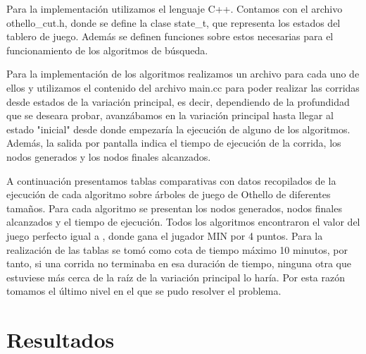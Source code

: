 \documentclass{article}
\begin{document}
\hspace{0.5cm}Para la implementación utilizamos el lenguaje C++. Contamos con el archivo
othello\_cut.h, donde se define la clase state\_t, que representa los estados del tablero de juego. Además
se definen funciones sobre estos necesarias para el funcionamiento de los algoritmos de búsqueda. 

Para la implementación de los algoritmos realizamos un archivo para cada uno de ellos y utilizamos el contenido del archivo main.cc para poder realizar las corridas desde estados de la variación principal, es decir, dependiendo de la profundidad que se deseara probar, avanzábamos en la variación principal hasta llegar al estado "inicial" desde donde empezaría la ejecución de alguno de los algoritmos. Además, la salida por pantalla indica el tiempo de ejecución de la corrida, los nodos generados y los nodos finales alcanzados.

A continuación presentamos tablas comparativas con datos recopilados de la
ejecución de cada algoritmo sobre árboles de juego de Othello de diferentes tamaños. Para cada algoritmo se
presentan los nodos generados, nodos finales alcanzados y el tiempo de ejecución. Todos los algoritmos encontraron el valor del juego
perfecto igual a , donde gana el jugador MIN por 4 puntos. Para la realización de las tablas se tomó como cota de tiempo máximo 10 minutos, por tanto, si una corrida no terminaba en esa duración de tiempo, ninguna otra que estuviese más cerca de la raíz de la variación principal lo haría. Por esta razón tomamos el último nivel en el que se pudo resolver el problema.

\section{Resultados}
\end{document}
